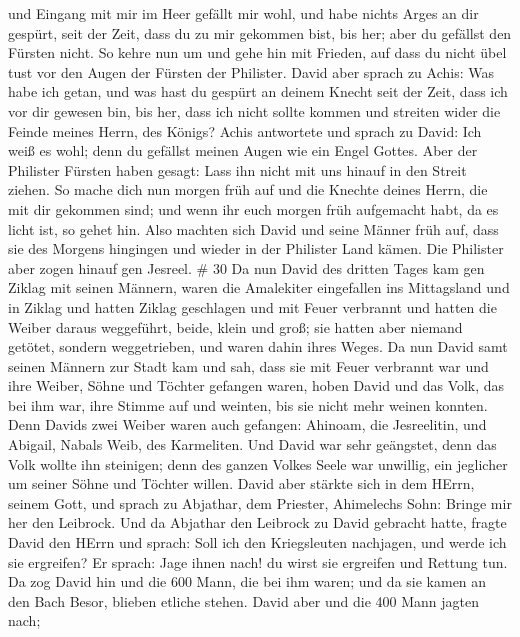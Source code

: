 und Eingang mit mir im Heer gefällt mir wohl, und habe nichts Arges an
dir gespürt, seit der Zeit, dass du zu mir gekommen bist, bis her; aber
du gefällst den Fürsten nicht.  So kehre nun um und gehe hin
mit Frieden, auf dass du nicht übel tust vor den Augen der Fürsten der
Philister.  David aber sprach zu Achis: Was habe ich getan,
und was hast du gespürt an deinem Knecht seit der Zeit, dass ich vor dir
gewesen bin, bis her, dass ich nicht sollte kommen und streiten wider
die Feinde meines Herrn, des Königs?  Achis antwortete und
sprach zu David: Ich weiß es wohl; denn du gefällst meinen Augen wie ein
Engel Gottes. Aber der Philister Fürsten haben gesagt: Lass ihn nicht
mit uns hinauf in den Streit ziehen.  So mache dich nun
morgen früh auf und die Knechte deines Herrn, die mit dir gekommen sind;
und wenn ihr euch morgen früh aufgemacht habt, da es licht ist, so gehet
hin.  Also machten sich David und seine Männer früh auf,
dass sie des Morgens hingingen und wieder in der Philister Land kämen.
Die Philister aber zogen hinauf gen Jesreel. \# 30  Da nun
David des dritten Tages kam gen Ziklag mit seinen Männern, waren die
Amalekiter eingefallen ins Mittagsland und in Ziklag und hatten Ziklag
geschlagen und mit Feuer verbrannt  und hatten die Weiber
daraus weggeführt, beide, klein und groß; sie hatten aber niemand
getötet, sondern weggetrieben, und waren dahin ihres Weges. 
Da nun David samt seinen Männern zur Stadt kam und sah, dass sie mit
Feuer verbrannt war und ihre Weiber, Söhne und Töchter gefangen waren,
 hoben David und das Volk, das bei ihm war, ihre Stimme auf
und weinten, bis sie nicht mehr weinen konnten.  Denn Davids
zwei Weiber waren auch gefangen: Ahinoam, die Jesreelitin, und Abigail,
Nabals Weib, des Karmeliten.  Und David war sehr geängstet,
denn das Volk wollte ihn steinigen; denn des ganzen Volkes Seele war
unwillig, ein jeglicher um seiner Söhne und Töchter willen. David aber
stärkte sich in dem HErrn, seinem Gott,  und sprach zu
Abjathar, dem Priester, Ahimelechs Sohn: Bringe mir her den Leibrock.
Und da Abjathar den Leibrock zu David gebracht hatte, 
fragte David den HErrn und sprach: Soll ich den Kriegsleuten nachjagen,
und werde ich sie ergreifen? Er sprach: Jage ihnen nach! du wirst sie
ergreifen und Rettung tun.  Da zog David hin und die 600
Mann, die bei ihm waren; und da sie kamen an den Bach Besor, blieben
etliche stehen.  David aber und die 400 Mann jagten nach;

